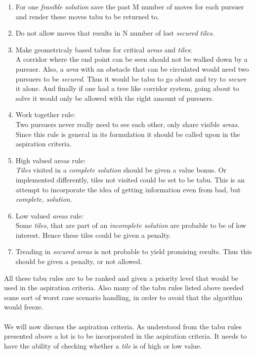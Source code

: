 \begin{enumerate}
\item{}For one \emph{feasible solution} save the past M number of moves for each pursuer and render these moves tabu to be returned to.
\item{}Do not allow moves that results in N number of lost \emph{secured} \emph{tiles}.
\item{}Make geometricaly based tabus for critical \emph{areas} and \emph{tiles}:\vspace{0,1cm}\\
A corridor where the end point can be seen should not be walked down by a pursuer. Also, a \emph{area} with an obstacle that can be circulated would need two pursuers to be \emph{secured}. Thus it would be tabu to go about and try to \emph{secure} it alone. And finally if one had a tree like corridor system, going about to solve it would only be allowed with the right amount of pursuers.
\item{} Work together rule: \vspace{0,1cm}\\
Two pursuers never really need to see each other, only share visible \emph{areas}. Since this rule is general in its formulation it should be called upon in the aspiration criteria.
\item{} High valued areas rule: \vspace{0,1cm}\\
\emph{Tiles} visited in a \emph{complete solution} should be given a value bonus. Or implemented differently, tiles not visited could be set to be tabu. This is an attempt to incorporate the idea of getting information even from bad, but \emph{complete, solution}.
\item{} Low valued \emph{areas} rule: \vspace{0,1cm}\\
Some \emph{tiles}, that are part of an \emph{incomplete solution} are probable to be of low interest. Hence these tiles could be given a penalty.
\item{} Treading in \emph{secured} \emph{areas} is not probable to yield promising results. Thus this should be given a penalty, or not allowed.
\end{enumerate}

All these tabu rules are to be ranked and given a priority level that would be used in the aspiration criteria. Also many of the tabu rules listed above needed some sort of worst case scenario handling, in order to avoid that the algorithm would freeze.\\
\\We will now discuss the aspiration criteria. As understood from the tabu rules presented above a lot is to be incorporated in the aspiration criteria. It needs to have the ability of checking whether a \emph{tile} is of high or low value.

